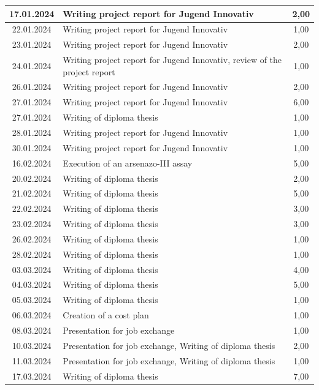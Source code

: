 \begin{longtable}{|c|p{9cm}|c|}
        17.01.2024 & Writing project report for Jugend Innovativ & 2,00 \\ \hline
        22.01.2024 & Writing project report for Jugend Innovativ & 1,00 \\ \hline
        23.01.2024 & Writing project report for Jugend Innovativ & 2,00 \\ \hline
        24.01.2024 & Writing project report for Jugend Innovativ, review of the project report & 1,00 \\ \hline
        26.01.2024 & Writing project report for Jugend Innovativ & 2,00 \\ \hline
        27.01.2024 & Writing project report for Jugend Innovativ & 6,00 \\ \hline
        27.01.2024 & Writing of diploma thesis & 1,00 \\ \hline
        28.01.2024 & Writing project report for Jugend Innovativ & 1,00 \\ \hline
        30.01.2024 & Writing project report for Jugend Innovativ & 1,00 \\ \hline
        16.02.2024 & Execution of an arsenazo-III assay & 5,00 \\ \hline
        20.02.2024 & Writing of diploma thesis & 2,00 \\ \hline
        21.02.2024 & Writing of diploma thesis & 5,00 \\ \hline
        22.02.2024 & Writing of diploma thesis & 3,00 \\ \hline
        23.02.2024 & Writing of diploma thesis & 3,00 \\ \hline
        26.02.2024 & Writing of diploma thesis & 1,00 \\ \hline
        28.02.2024 & Writing of diploma thesis & 1,00 \\ \hline
        03.03.2024 & Writing of diploma thesis & 4,00 \\ \hline
        04.03.2024 & Writing of diploma thesis & 5,00 \\ \hline
        05.03.2024 & Writing of diploma thesis & 1,00 \\ \hline
        06.03.2024 & Creation of a cost plan & 1,00 \\ \hline
        08.03.2024 & Presentation for job exchange & 1,00 \\ \hline
        10.03.2024 & Presentation for job exchange, Writing of diploma thesis & 2,00 \\ \hline
        11.03.2024 & Presentation for job exchange, Writing of diploma thesis & 1,00 \\ \hline
        17.03.2024 & Writing of diploma thesis & 7,00 \\ \hline

\end{longtable}

